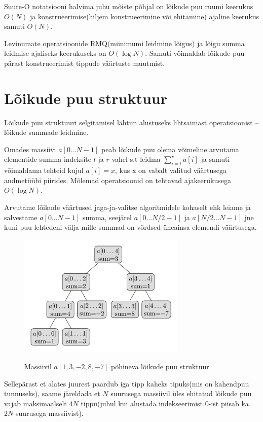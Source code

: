 \documentclass{trkut}
\begin{document}
Suure-O notatsiooni halvima juhu mõiste põhjal on lõikude puu ruumi keerukus $O(N)$ ja konstrueerimise(hiljem konstrueerimine või ehitamine) ajaline keerukus samuti $O(N)$. \parencite{ITS}

Levinumate operatsioonide RMQ(miinimumi leidmine lõigus) ja lõigu summa leidmise ajaliseks keerukuseks on $O(\log N)$.
Samuti võimaldab lõikude puu pärast konstrueerimist tippude väärtuste muutmist. \parencite{EMaxx}

\section{Lõikude puu struktuur}
Lõikude puu struktuuri selgitamisel lähtun alustuseks lihtsaimast operatsioonist -- lõikude summade leidmine.

Omades massiivi $a[0...N-1]$ peab lõikude puu olema võimeline arvutama elementide summa indeksite $l$ ja $r$ vahel s.t leidma $\sum_{i=l}^{r} {a[i]}$ ja samuti võimaldama tehteid kujul $a[i] = x$, kus x on vabalt valitud väärtusega andmetüübi piirides. Mõlemad operatsioonid on tehtavad ajakeerukusega $O(\log N)$. \parencite{EMaxx}

Arvutame lõikude väärtused jaga-ja-valitse algoritmidele kohaselt ehk leiame ja salvestame $a[0...N-1]$ summa, seejärel $a[0...N/2-1]$ ja $a[N/2...N-1]$ jne kuni puu lehtedeni välja mille summad on võrdsed üheainsa elemendi väärtusega. \parencite{EMaxx}

\begin{figure}[H]%
    \includegraphics[width=8cm]{LPUU.png}%
    \caption{Massiivil $a[1,3,-2,8,-7]$ põhineva lõikude puu struktuur}%
    \label{CPH}%
\end{figure}

Sellepärast et alates juurest paardub iga tipp kaheks tipuks(mis on kahendpuu tunnuseks), saame järeldada et $N$ suurusega massiivil üles ehitatud lõikude puu vajab maksimaalselt $4N$ tippu(juhul kui alustada indekseerimist 0-ist piisab ka $2N$ suurusega massiivist). \parencite{EMaxx}
\end{document}
